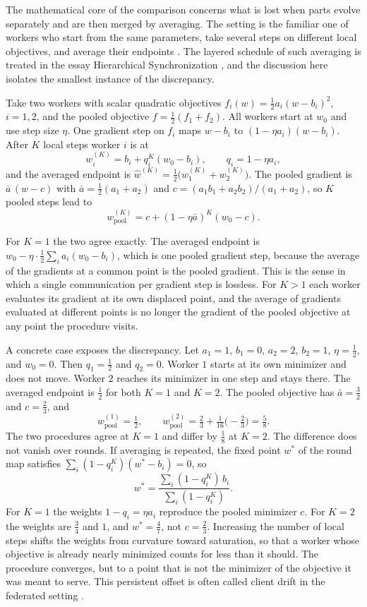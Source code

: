 \documentclass[11pt]{article}
\theoremstyle{definition}
\theoremstyle{plain}
\theoremstyle{remark}
\begin{document}
The mathematical core of the comparison concerns what is lost when parts evolve separately and are then merged by averaging. The setting is the familiar one of workers who start from the same parameters, take several steps on different local objectives, and average their endpoints \cite{mcmahan2017,stich2019}. The layered schedule of such averaging is treated in the essay Hierarchical Synchronization \cite{flyxion2026hs}, and the discussion here isolates the smallest instance of the discrepancy.

Take two workers with scalar quadratic objectives $f_i(w)=\tfrac12 a_i(w-b_i)^2$, $i=1,2$, and the pooled objective $f=\tfrac12(f_1+f_2)$. All workers start at $w_0$ and use step size $\eta$. One gradient step on $f_i$ maps $w-b_i$ to $(1-\eta a_i)(w-b_i)$. After $K$ local steps worker $i$ is at
\[
w_i^{(K)}=b_i+q_i^{K}(w_0-b_i),\qquad q_i=1-\eta a_i,
\]
and the averaged endpoint is $\hat w^{(K)}=\tfrac12\bigl(w_1^{(K)}+w_2^{(K)}\bigr)$. The pooled gradient is $\bar a\,(w-c)$ with $\bar a=\tfrac12(a_1+a_2)$ and $c=(a_1b_1+a_2b_2)/(a_1+a_2)$, so $K$ pooled steps lead to
\[
w^{(K)}_{\text{pool}}=c+(1-\eta\bar a)^{K}(w_0-c).
\]

For $K=1$ the two agree exactly. The averaged endpoint is $w_0-\eta\cdot\tfrac12\sum_i a_i(w_0-b_i)$, which is one pooled gradient step, because the average of the gradients at a common point is the pooled gradient. This is the sense in which a single communication per gradient step is lossless. For $K>1$ each worker evaluates its gradient at its own displaced point, and the average of gradients evaluated at different points is no longer the gradient of the pooled objective at any point the procedure visits.

A concrete case exposes the discrepancy. Let $a_1=1$, $b_1=0$, $a_2=2$, $b_2=1$, $\eta=\tfrac12$, and $w_0=0$. Then $q_1=\tfrac12$ and $q_2=0$. Worker $1$ starts at its own minimizer and does not move. Worker $2$ reaches its minimizer in one step and stays there. The averaged endpoint is $\tfrac12$ for both $K=1$ and $K=2$. The pooled objective has $\bar a=\tfrac32$ and $c=\tfrac23$, and
\[
w^{(1)}_{\text{pool}}=\tfrac12,\qquad w^{(2)}_{\text{pool}}=\tfrac23+\tfrac1{16}\bigl(-\tfrac23\bigr)=\tfrac58.
\]
The two procedures agree at $K=1$ and differ by $\tfrac18$ at $K=2$. The difference does not vanish over rounds. If averaging is repeated, the fixed point $w^{*}$ of the round map satisfies $\sum_i(1-q_i^{K})(w^{*}-b_i)=0$, so
\[
w^{*}=\frac{\sum_i(1-q_i^{K})\,b_i}{\sum_i(1-q_i^{K})}.
\]
For $K=1$ the weights $1-q_i=\eta a_i$ reproduce the pooled minimizer $c$. For $K=2$ the weights are $\tfrac34$ and $1$, and $w^{*}=\tfrac47$, not $c=\tfrac23$. Increasing the number of local steps shifts the weights from curvature toward saturation, so that a worker whose objective is already nearly minimized counts for less than it should. The procedure converges, but to a point that is not the minimizer of the objective it was meant to serve. This persistent offset is often called client drift in the federated setting \cite{li2020,karimireddy2020}.
\end{document}
